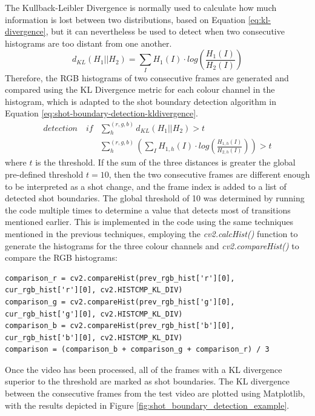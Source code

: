 The Kullback-Leibler Divergence is normally used to calculate how much information is lost between two distributions, based on Equation \ref{eq:kl-divergence}, but it can nevertheless be used to detect when two consecutive histograms are too distant from one another.
\begin{equation}
\label{eq:kl-divergence}
    d_{KL}(H_1||H_2)=\sum_I H_1(I)\cdot log(\frac{H_1(I)}{H_2(I)})
\end{equation}
Therefore, the RGB histograms of two consecutive frames are generated and compared using the KL Divergence metric for each colour channel in the histogram, which is adapted to the shot boundary detection algorithm in Equation \ref{eq:shot-boundary-detection-kldivergence}. 
\begin{equation}
\label{eq:shot-boundary-detection-kldivergence}
\begin{aligned}
    detection \quad if & \sum_{h}^{(r,g,b)}d_{KL}(H_1||H_2) > t \\
    & \sum_{h}^{(r,g,b)} (\sum_I H_{1,h}(I)\cdot log(\frac{H_{1,h}(I)}{H_{2,h}(I)})) > t
\end{aligned}
\end{equation}
where $t$ is the threshold. If the sum of the three distances is greater the global pre-defined threshold $t=10$, then the two consecutive frames are different enough to be interpreted as a shot change, and the frame index is added to a list of detected shot boundaries. The global threshold of 10 was determined by running the code multiple times to determine a value that detects most of transitions mentioned earlier. This is implemented in the code using the same techniques mentioned in the previous techniques, employing the \textit{cv2.calcHist()} function to generate the histograms for the three colour channels and \textit{cv2.compareHist()} to compare the RGB histograms:

\begin{lstlisting}
comparison_r = cv2.compareHist(prev_rgb_hist['r'][0], cur_rgb_hist['r'][0], cv2.HISTCMP_KL_DIV)
comparison_g = cv2.compareHist(prev_rgb_hist['g'][0], cur_rgb_hist['g'][0], cv2.HISTCMP_KL_DIV)
comparison_b = cv2.compareHist(prev_rgb_hist['b'][0], cur_rgb_hist['b'][0], cv2.HISTCMP_KL_DIV)
comparison = (comparison_b + comparison_g + comparison_r) / 3
\end{lstlisting}

Once the video has been processed, all of the frames with a KL divergence superior to the threshold are marked as shot boundaries. The KL divergence between the consecutive frames from the test video are plotted using Matplotlib, with the results depicted in Figure \ref{fig:shot_boundary_detection_example}.


